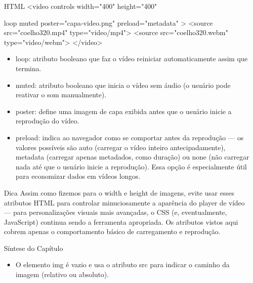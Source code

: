 \begin{codebox}{HTML}
<video
  controls
  width="400"
  height="400"
\end{codebox}

\begin{codebox}{loop}
muted
poster="capa-video.png"
preload="metadata"
>
<source src="coelho320.mp4" type="video/mp4">
<source src="coelho320.webm" type="video/webm">
</video>
\end{codebox}

\begin{itemize}
  \item loop: atributo booleano que faz o vídeo reiniciar automaticamente assim que termina.
  \item muted: atributo booleano que inicia o vídeo sem áudio (o usuário pode reativar o som manualmente).
\end{itemize}

\begin{itemize}
  \item poster: define uma imagem de capa exibida antes que o usuário inicie a reprodução do vídeo.
\end{itemize}

\begin{itemize}
  \item preload: indica ao navegador como se comportar antes da reprodução — os valores possíveis são auto (carregar o vídeo inteiro antecipadamente), metadata (carregar apenas metadados, como duração) ou none (não carregar nada até que o usuário inicie a reprodução). Essa opção é especialmente útil para economizar dados em vídeos longos.
\end{itemize}

\begin{infobox}{Dica}
Assim como fizemos para o width e height de imagens, evite usar esses atributos HTML para controlar minuciosamente a aparência do player de vídeo — para personalizações visuais mais avançadas, o CSS (e, eventualmente, JavaScript) continua sendo a ferramenta apropriada. Os atributos vistos aqui cobrem apenas o comportamento básico de carregamento e reprodução.
\end{infobox}

Síntese do Capítulo

\begin{itemize}
  \item O elemento img é vazio e usa o atributo src para indicar o caminho da imagem (relativo ou absoluto).
\end{itemize}

